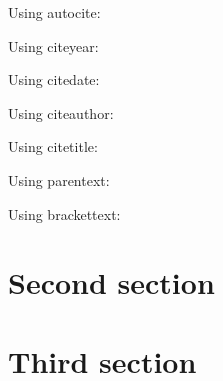 Using autocite: \autocite[prenote][postnote]{RN4}

Using citeyear: \citeyear{RN4}

Using citedate: 

Using citeauthor: \citeauthor{RN4}
 
Using citetitle: 

Using parentext: 

Using brackettext: 

\section{Second section}
\section{Third section}